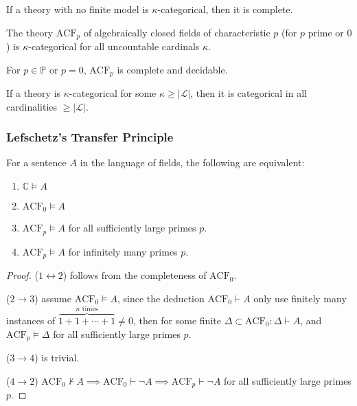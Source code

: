 \documentclass[UTF8,aspectratio=43,11pt,colorlinks,compress,openany]{beamer}%
\begin{document}
\begin{frame}\frametitle{}
	\begin{theorem}
		If a theory with no finite model is $\kappa$-categorical, then it is complete.
	\end{theorem}
	\begin{theorem}
	The theory $\mathrm{ACF}_p$ of algebraically closed fields of characteristic $p$ (for $p$ prime or $0$) is $\kappa$-categorical for all uncountable cardinals $\kappa$.
	\end{theorem}
	\begin{corollary}
	For $p\in\mathbb{P}$ or $p=0$, $\mathrm{ACF}_p$ is complete and decidable.
	\end{corollary}
	\begin{theorem}
		If a theory is $\kappa$-categorical for some $\kappa\geq|\mathscr{L}|$, then it is categorical in all cardinalities $\geq|\mathscr{L}|$.
	\end{theorem}
\end{frame}

\begin{frame}\frametitle{Lefschetz's Transfer Principle}\vspace*{-3pt}
\begin{theorem}
For a sentence $A$ in the language of fields, the following are equivalent:
\begin{enumerate}
	\item $\mathbb{C}\vDash A$
	\item $\mathrm{ACF}_0\vDash A$
	\item $\mathrm{ACF}_p\vDash A$ for all sufficiently large primes $p$.
	\item $\mathrm{ACF}_p\vDash A$ for infinitely many primes $p$.
\end{enumerate}
\end{theorem}\vspace*{-2pt}
\begin{proof}
($1\leftrightarrow 2$) follows from the completeness of $\mathrm{ACF}_0$.

($2\to 3$) assume
$\mathrm{ACF}_0\vDash A$, since the deduction $\mathrm{ACF}_0\vdash A$ only use finitely many instances of $\overbrace{1 + 1 + \cdots + 1}^{n\text{ times}} \ne 0$, then for some finite $\Delta\subset\mathrm{ACF}_0: \Delta\vdash A$, and $\mathrm{ACF}_p\vDash\Delta$ for all sufficiently large primes $p$.

($3\to 4$) is trivial.

($4\to 2$) $\mathrm{ACF}_0\nvdash A\implies\mathrm{ACF}_0\vdash\neg A\implies\mathrm{ACF}_p\vdash\neg A$ for all sufficiently large primes $p$.
\end{proof}
\end{frame}
\end{document}
